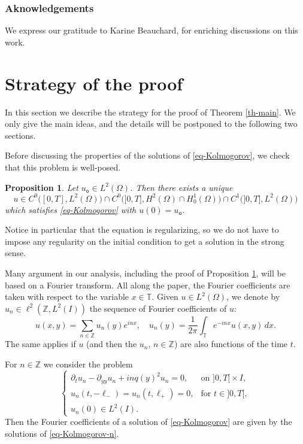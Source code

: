 \documentclass[10pt]{amsart}
\theoremstyle{plain}
\newtheorem{proposition}[theorem]{Proposition}
\theoremstyle{definition}
\newcommand{\1}{\mathds 1}
\newcommand{\Z}{\mathbb{Z}}
\newcommand{\T}{\mathbb{T}}
\let\O\Omega
\newcommand{\uo}{u_{\mathsf{o}}}
\begin{document}
\subsubsection*{Aknowledgements} We express our gratitude to Karine Beauchard, for enriching discussions on this work.


\section{Strategy of the proof} \label{sec-strategy}

In this section we describe the strategy for the proof of Theorem \ref{th-main}. We only give the main ideas, and the details will be postponed to the following two sections.


Before discussing the properties of the solutions of \eqref{eq-Kolmogorov}, we check that this problem is well-posed.

\begin{proposition} \label{prop-well-posedness}
Let $\uo \in L^2(\O)$. Then there exists a unique
\[
u \in C^0 \bigl([0,T],L^2(\O) \bigr) \cap C^0 \bigl(]0,T],H^2(\O) \cap H^1_0(\O) \bigr) \cap C^1 \bigl(]0,T], L^2(\O) \bigr)
\]
which satisfies \eqref{eq-Kolmogorov} with $u(0) = \uo$.
\end{proposition}

Notice in particular that the equation is regularizing, so we do not have to impose any regularity on the initial condition to get a solution in the strong sense.

Many argument in our analysis, including the proof of Proposition \ref{prop-well-posedness}, will be based on a Fourier transform. All along the paper, the Fourier coefficients are taken with respect to the variable $x \in \T$. Given $u \in L^2(\O)$, we denote by $u_n \in \ell^2(\Z,L^2(I))$ the sequence of Fourier coefficients of $u$:
\[
u(x,y) = \sum_{n\in \mathbb{Z}} u_n(y) e^{i n x}, \quad u_n (y) = \frac 1 {2\pi} \int_\T e^{-inx} u(x,y) \, dx.
\]
The same applies if $u$ (and then the $u_n$, $n \in \Z$) are also functions of the time $t$.

For $n \in \Z$ we consider the problem
\begin{equation} \label{eq-Kolmogorov-n}
\begin{cases}
\partial_t u_n - \partial_{yy} u_n + inq(y)^2 u_n = 0, & \text{on } ]0,T[{}\times I,\\
u_n(t,-\ell_-) = u_n(t,\ell_+) = 0, & \text{for } t \in{}]0,T[,\\
u_n(0) \in L^2(I).
\end{cases}
\end{equation}
Then the Fourier coefficients of a solution of \eqref{eq-Kolmogorov} are given by the solutions of \eqref{eq-Kolmogorov-n}.
\end{document}
